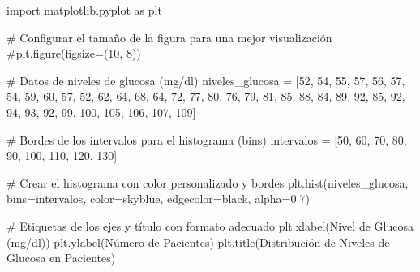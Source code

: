 \documentclass[
  jou,
  floatsintext,
  longtable,
  a4paper,
  nolmodern,
  notxfonts,
  notimes,
  12pt,
  colorlinks=true,linkcolor=blue,citecolor=blue,urlcolor=blue]{apa7}
\newenvironment{Shaded}{\begin{snugshade}}{\end{snugshade}}
\newcommand{\CommentTok}[1]{\textcolor[rgb]{0.37,0.37,0.37}{#1}}
\newcommand{\DecValTok}[1]{\textcolor[rgb]{0.68,0.00,0.00}{#1}}
\newcommand{\FloatTok}[1]{\textcolor[rgb]{0.68,0.00,0.00}{#1}}
\newcommand{\ImportTok}[1]{\textcolor[rgb]{0.00,0.46,0.62}{#1}}
\newcommand{\NormalTok}[1]{\textcolor[rgb]{0.00,0.23,0.31}{#1}}
\newcommand{\OperatorTok}[1]{\textcolor[rgb]{0.37,0.37,0.37}{#1}}
\newcommand{\StringTok}[1]{\textcolor[rgb]{0.13,0.47,0.30}{#1}}
\begin{document}
\begin{Shaded}
\begin{Highlighting}[]
\ImportTok{import}\NormalTok{ matplotlib.pyplot }\ImportTok{as}\NormalTok{ plt}

\CommentTok{\# Configurar el tamaño de la figura para una mejor visualización}
\CommentTok{\#plt.figure(figsize=(10, 8))}

\CommentTok{\# Datos de niveles de glucosa (mg/dl)}
\NormalTok{niveles\_glucosa }\OperatorTok{=}\NormalTok{ [}\DecValTok{52}\NormalTok{, }\DecValTok{54}\NormalTok{, }\DecValTok{55}\NormalTok{, }\DecValTok{57}\NormalTok{, }\DecValTok{56}\NormalTok{, }\DecValTok{57}\NormalTok{, }\DecValTok{54}\NormalTok{, }\DecValTok{59}\NormalTok{, }\DecValTok{60}\NormalTok{, }\DecValTok{57}\NormalTok{, }\DecValTok{52}\NormalTok{, }\DecValTok{62}\NormalTok{, }\DecValTok{64}\NormalTok{, }\DecValTok{68}\NormalTok{, }\DecValTok{64}\NormalTok{, }\DecValTok{72}\NormalTok{, }\DecValTok{77}\NormalTok{, }\DecValTok{80}\NormalTok{, }
                   \DecValTok{76}\NormalTok{, }\DecValTok{79}\NormalTok{, }\DecValTok{81}\NormalTok{, }\DecValTok{85}\NormalTok{, }\DecValTok{88}\NormalTok{, }\DecValTok{84}\NormalTok{, }\DecValTok{89}\NormalTok{, }\DecValTok{92}\NormalTok{, }\DecValTok{85}\NormalTok{, }\DecValTok{92}\NormalTok{, }\DecValTok{94}\NormalTok{, }\DecValTok{93}\NormalTok{, }\DecValTok{92}\NormalTok{, }\DecValTok{99}\NormalTok{, }\DecValTok{100}\NormalTok{, }\DecValTok{105}\NormalTok{, }\DecValTok{106}\NormalTok{, }\DecValTok{107}\NormalTok{, }\DecValTok{109}\NormalTok{]}

\CommentTok{\# Bordes de los intervalos para el histograma (bins)}
\NormalTok{intervalos }\OperatorTok{=}\NormalTok{ [}\DecValTok{50}\NormalTok{, }\DecValTok{60}\NormalTok{, }\DecValTok{70}\NormalTok{, }\DecValTok{80}\NormalTok{, }\DecValTok{90}\NormalTok{, }\DecValTok{100}\NormalTok{, }\DecValTok{110}\NormalTok{, }\DecValTok{120}\NormalTok{, }\DecValTok{130}\NormalTok{]}

\CommentTok{\# Crear el histograma con color personalizado y bordes}
\NormalTok{plt.hist(niveles\_glucosa, bins}\OperatorTok{=}\NormalTok{intervalos, color}\OperatorTok{=}\StringTok{\textquotesingle{}skyblue\textquotesingle{}}\NormalTok{, edgecolor}\OperatorTok{=}\StringTok{\textquotesingle{}black\textquotesingle{}}\NormalTok{, alpha}\OperatorTok{=}\FloatTok{0.7}\NormalTok{)}

\CommentTok{\# Etiquetas de los ejes y título con formato adecuado}
\NormalTok{plt.xlabel(}\StringTok{\textquotesingle{}Nivel de Glucosa (mg/dl)\textquotesingle{}}\NormalTok{)}
\NormalTok{plt.ylabel(}\StringTok{\textquotesingle{}Número de Pacientes\textquotesingle{}}\NormalTok{)}
\NormalTok{plt.title(}\StringTok{\textquotesingle{}Distribución de Niveles de Glucosa en Pacientes\textquotesingle{}}\NormalTok{)}


\end{Highlighting}
\end{Shaded}
\end{document}
